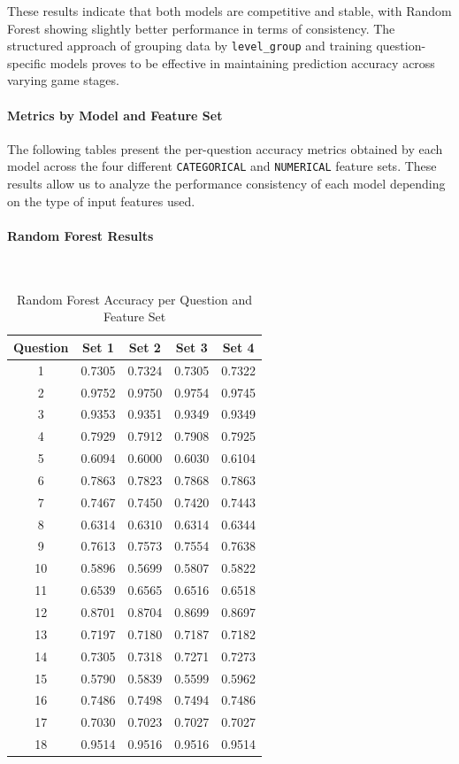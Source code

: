 \documentclass[12pt]{article}
\begin{document}
	\vspace{0.5em}
	These results indicate that both models are competitive and stable, with Random Forest showing slightly better performance in terms of consistency. The structured approach of grouping data by \texttt{level\_group} and training question-specific models proves to be effective in maintaining prediction accuracy across varying game stages.
	
	\paragraph{Metrics by Model and Feature Set}
	
	The following tables present the per-question accuracy metrics obtained by each model across the four different \texttt{CATEGORICAL} and \texttt{NUMERICAL} feature sets. These results allow us to analyze the performance consistency of each model depending on the type of input features used.
	
	\paragraph{Random Forest Results}\mbox{}\\
	
	\begin{table}[H]
		\centering
		\small
		\caption{Random Forest Accuracy per Question and Feature Set}
		\begin{tabular}{c|cccc}
			\toprule
			\textbf{Question} & \textbf{Set 1} & \textbf{Set 2} & \textbf{Set 3} & \textbf{Set 4} \\
			\midrule
			1  & 0.7305 & 0.7324 & 0.7305 & 0.7322 \\
			2  & 0.9752 & 0.9750 & 0.9754 & 0.9745 \\
			3  & 0.9353 & 0.9351 & 0.9349 & 0.9349 \\
			4  & 0.7929 & 0.7912 & 0.7908 & 0.7925 \\
			5  & 0.6094 & 0.6000 & 0.6030 & 0.6104 \\
			6  & 0.7863 & 0.7823 & 0.7868 & 0.7863 \\
			7  & 0.7467 & 0.7450 & 0.7420 & 0.7443 \\
			8  & 0.6314 & 0.6310 & 0.6314 & 0.6344 \\
			9  & 0.7613 & 0.7573 & 0.7554 & 0.7638 \\
			10 & 0.5896 & 0.5699 & 0.5807 & 0.5822 \\
			11 & 0.6539 & 0.6565 & 0.6516 & 0.6518 \\
			12 & 0.8701 & 0.8704 & 0.8699 & 0.8697 \\
			13 & 0.7197 & 0.7180 & 0.7187 & 0.7182 \\
			14 & 0.7305 & 0.7318 & 0.7271 & 0.7273 \\
			15 & 0.5790 & 0.5839 & 0.5599 & 0.5962 \\
			16 & 0.7486 & 0.7498 & 0.7494 & 0.7486 \\
			17 & 0.7030 & 0.7023 & 0.7027 & 0.7027 \\
			18 & 0.9514 & 0.9516 & 0.9516 & 0.9514 \\
			\bottomrule
		\end{tabular}
		\label{tab:rf_metrics}
	\end{table}
	
\end{document}
